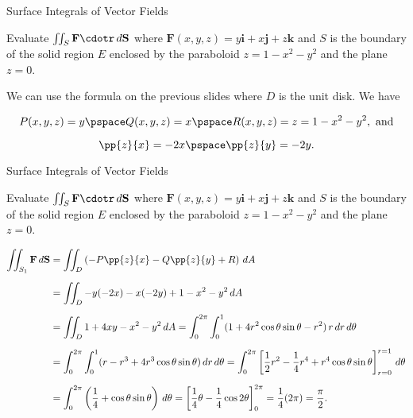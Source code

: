 \documentclass[11pt,english,
handout
]{beamer}
\begin{document}
\begin{frame}[t]{Surface Integrals of Vector Fields}
\small
\begin{example}
Evaluate $\iint_S\mathbf{F}\cdotr\,d\mathbf{S}$ where $\mathbf{F}(x,y,z)=y\mathbf{i}+x\mathbf{j}+z\mathbf{k}$ and $S$ is the boundary of the solid region $E$ enclosed by the paraboloid $z=1-x^2-y^2$ and the plane $z=0$.

\lspace
We can use the formula on the previous slides where $D$ is the unit disk. \pause We have

\[
P(x,y,z)=y\pspace Q(x,y,z)=x\pspace R(x,y,z)=z=1-x^2-y^2,\text{ and}
\]



\[
\pp{z}{x}=-2x \pspace \pp{z}{y}=-2y.
\]
\end{example}
\end{frame}













\begin{frame}[t]{Surface Integrals of Vector Fields}
\small
\begin{example}
Evaluate $\iint_S\mathbf{F}\cdotr\,d\mathbf{S}$ where $\mathbf{F}(x,y,z)=y\mathbf{i}+x\mathbf{j}+z\mathbf{k}$ and $S$ is the boundary of the solid region $E$ enclosed by the paraboloid $z=1-x^2-y^2$ and the plane $z=0$.


{\scriptsize
\begin{align*}
\iint_{S_1}\mathbf{F}\,d\mathbf{S}&=\iint_D\left(-P\pp{z}{x}-Q\pp{z}{y}+R\right)\,dA\\[2mm]
&=\iint_D-y(-2x)-x(-2y)+1-x^2-y^2\,dA\\[2mm]
&=\iint_D1+4xy-x^2-y^2\,dA=\int_0^{2\pi}\int_0^1(1+4r^2\cos\theta\sin\theta-r^2)\,r\,dr\,d\theta\\[2mm]
&=\int_0^{2\pi}\int_0^1(r-r^3+4r^3\cos\theta\sin\theta)\,dr\,d\theta=\int_0^{2\pi}\left[\frac{1}{2}r^2-\frac{1}{4}r^4+r^4\cos\theta\sin\theta\right]_{r=0}^{r=1}\,d\theta\\[2mm]
&=\int_0^{2\pi}\left(\frac{1}{4}+\cos\theta\sin\theta\right)\,d\theta=\left[\frac{1}{4}\theta-\frac{1}{4}\cos2\theta\right]_0^{2\pi}=\frac{1}{4}(2\pi)=\frac{\pi}{2}.
\end{align*}}
\end{example}
\end{frame}
\end{document}
